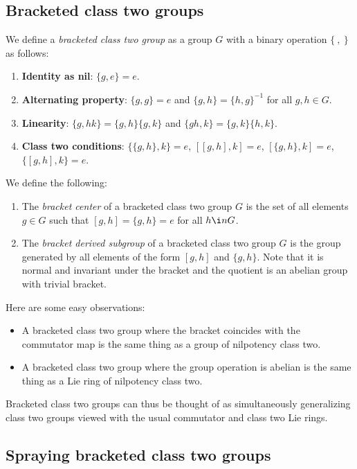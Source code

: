 \documentclass[10pt]{amsart}
\begin{document}
\subsection{Bracketed class two groups}

We define a {\em bracketed class two group} as a group $G$ with a binary
operation $\{ \ , \ \}$ as follows:

\begin{enumerate}
\item {\bf Identity as nil}: $\{ g,e \} = e$.
\item {\bf Alternating property}: $\{ g,g \} = e$ and $\{ g,h \} = \{
  h,g \}^{-1}$ for all $g,h \in G$.
\item {\bf Linearity}: $\{g,hk \} = \{ g,h \} \{ g,k\}$
  and $\{ gh,k \} = \{ g,k \} \{ h,k \}$.
\item {\bf Class two conditions}: $\{ \{ g,h \}, k \} = e$, $[[g,h],k]=e$, $[\{g,h\},k] = e$,
  $\{[g,h],k\} = e$.
\end{enumerate}

We define the following:

\begin{enumerate}
\item The {\em bracket center} of a bracketed class two group $G$ is
  the set of all elements $g \in G$ such that $[g,h] = \{ g, h \} = e$
  for all $h \i nG$.
\item The {\em bracket derived subgroup} of a bracketed class two
  group $G$ is the group generated by all elements of the form $[g,h]$
  and $\{ g,h \}$. Note that it is normal and invariant under the
  bracket and the quotient is an abelian group with trivial bracket.
\end{enumerate}

Here are some easy observations:

\begin{itemize}
\item A bracketed class two group where the bracket coincides with the
  commutator map is the same thing as a group of nilpotency class two.
\item A bracketed class two group where the group operation is abelian
  is the same thing as a Lie ring of nilpotency class two.
\end{itemize}

Bracketed class two groups can thus be thought of as simultaneously
generalizing class two groups viewed with the usual commutator and
class two Lie rings.

\subsection{Spraying bracketed class two groups}
\end{document}

